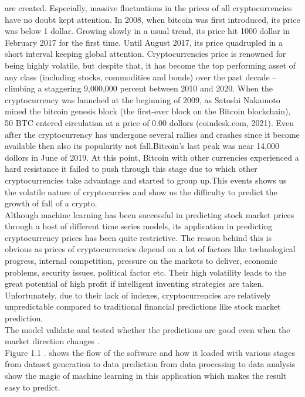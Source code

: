 \documentclass[openany,12pt]{report}
\begin{document}
are created.
Especially, massive fluctuations in the prices of all cryptocurrencies have no doubt kept attention. In 2008, when bitcoin was first introduced, its price was below 1 dollar. Growing slowly in a usual trend, its price hit 1000 dollar in February 2017 for the first time. Until August 2017, its price quadrupled in a short interval keeping global attention. Cryptocurrencies price is renowned for being highly volatile, but despite that, it has become the top performing asset of any class (including stocks, commodities and bonds) over the past decade – climbing a staggering 9,000,000 percent between 2010 and 2020.
When the cryptocurrency was launched at the beginning of 2009, as Satoshi Nakamoto mined the bitcoin genesis block (the first-ever block on the Bitcoin blockchain), 50 BTC entered circulation at a price of 0.00 dollors (coindesk.com, 2021).
Even after the cryptocurrency has undergone several rallies and crashes since it become available then also its popularity not fall.Bitcoin's last peak was near 14,000 dollors in June of 2019.
At this point, Bitcoin with other currencies experienced a hard resistance it failed to push through this stage due to which other cryptocurrencies take advantage and started to group up.This events shows us the volatile nature of cryptocurries and show us the difficulty to predict the growth of fall of a crypto.\\ 
Although machine learning has been successful in predicting stock market prices through a host of different time series models, its application in predicting cryptocurrency prices has been quite restrictive. The reason behind this is obvious as prices of cryptocurrencies depend on a lot of factors like technological progress, internal competition, pressure on the markets to deliver, economic problems, security issues, political factor etc. Their high volatility leads to the great potential of high profit if intelligent inventing strategies are taken. Unfortunately, due to their lack of indexes, cryptocurrencies are relatively unpredictable compared to traditional financial predictions like stock market prediction.
\\
The model validate and tested whether the predictions are good even when the market direction changes .\\
Figure 1.1 . shows the flow of the software and how it loaded with various stages from dataset generation to data prediction from data  processing to data analysis show the magic of machine learning in this application which makes the result easy to predict.
\end{document}
